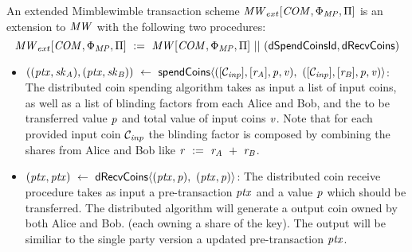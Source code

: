 \begin{definition}
    \label{def:ext-mw-tx-scheme}
    An extended Mimblewimble transaction scheme $\mathit{MW}_{ext}[\mathit{COM},\Phi_{\mathit{MP}},\Pi]$ is an extension to $\mathit{MW}$ with the following two procedures:
    \[ \mathit{MW}_{ext}[\mathit{COM},\Phi_{\mathit{MP}},\Pi] ~:=~ \mathit{MW}[\mathit{COM},\Phi_{\mathit{MP}},\Pi] ~||~ (\mathsf{dSpendCoinsId}, \mathsf{dRecvCoins}) \]
    \begin{itemize}
        \item $((\mathit{ptx},\mathit{sk}_{\mathit{A}}), (\mathit{ptx},\mathit{sk}_{\mathit{B}})) ~\leftarrow~ \mathsf{spendCoins} \langle ([\mathcal{C}_{\mathit{inp}}],[\mathit{r}_{\mathit{A}}],\mathit{p},\mathit{v}) ,~ ([\mathcal{C}_{\mathit{inp}}],[\mathit{r}_{\mathit{B}}],\mathit{p},\mathit{v}) \rangle$:
        The distributed coin spending algorithm takes as input a list of input coins, as well as a list of blinding factors from each Alice and Bob, and the to be transferred value $\mathit{p}$ and
        total value of input coins $\mathit{v}$. Note that for each provided input coin $\mathcal{C}_{\mathit{inp}}$ the blinding factor is composed by combining the shares from Alice and Bob like
        $\mathit{r} ~:=~ \mathit{r}_{\mathit{A}} ~+~ \mathit{r}_{\mathit{B}}$.
        \item $(\mathit{ptx}, \mathit{ptx}) ~\leftarrow~ \mathsf{dRecvCoins} \langle(\mathit{ptx},\mathit{p}) ,~ (\mathit{ptx},\mathit{p}) \rangle$: The distributed coin receive procedure takes as input a pre-transaction $\mathit{ptx}$ and
        a value $\mathit{p}$ which should be transferred. The distributed algorithm will generate a output coin owned by both Alice and Bob. (each owning a share of the key). The output will be similiar
        to the single party version a updated pre-transaction $\mathit{ptx}$.
    \end{itemize}
\end{definition}

